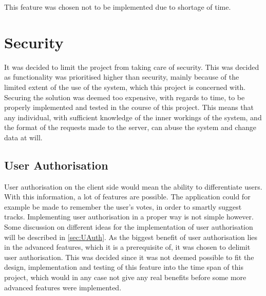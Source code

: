 This feature was chosen not to be implemented due to shortage of time.

\section{Security}
It was decided to limit the project from taking care of security. This was decided as functionality was prioritised higher than security, mainly because of the limited extent of the use of the system, which this project is concerned with. Securing the solution was deemed too expensive, with regards to time, to be properly implemented and tested in the course of this project.
This means that any individual, with sufficient knowledge of the inner workings of the system, and the format of the requests made to the server, can abuse the system and change data at will.

\subsection{User Authorisation}
\label{par:user_authorization}
User authorisation on the client side would mean the ability to differentiate users. With this information, a lot of features are possible. The application could for example be made to remember the user's votes, in order to smartly suggest tracks.
Implementing user authorisation in a proper way is not simple however. Some discussion on different ideas for the implementation of user authorisation will be described in \cref{sec:UAuth}.
As the biggest benefit of user authorisation lies in the advanced features, which it is a prerequisite of, it was chosen to delimit user authorisation. This was decided since it was not deemed possible to fit the design, implementation and testing of this feature into the time span of this project, which would in any case not give any real benefits before some more advanced features were implemented.
